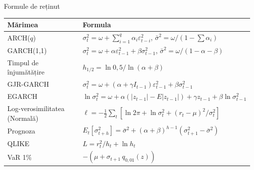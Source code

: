 \begin{frame}{Formule de reținut}
\itemsize{\small}
{\renewcommand{\arraystretch}{1.45}\begin{center}
\small
\begin{tabular}{ll}
\toprule
\textbf{Mărimea} & \textbf{Formula} \\
\midrule
ARCH($q$) & $\sigma_t^2 = \omega + \sum_{i=1}^{q}\alpha_i\varepsilon_{t-i}^2$, \quad $\bar\sigma^2 = \omega/(1 - \sum\alpha_i)$ \\
GARCH(1,1) & $\sigma_t^2 = \omega + \alpha\varepsilon_{t-1}^2 + \beta\sigma_{t-1}^2$, \quad $\bar\sigma^2 = \omega/(1 - \alpha - \beta)$ \\
Timpul de înjumătățire & $h_{1/2} = \ln 0{,}5/\ln(\alpha + \beta)$ \\
GJR-GARCH & $\sigma_t^2 = \omega + (\alpha + \gamma I_{t-1})\varepsilon_{t-1}^2 + \beta\sigma_{t-1}^2$ \\
EGARCH & $\ln\sigma_t^2 = \omega + \alpha(|z_{t-1}| - E|z_{t-1}|) + \gamma z_{t-1} + \beta\ln\sigma_{t-1}^2$ \\
Log-verosimilitatea (Normală) & $\ell = -\frac12\sum_t[\ln 2\pi + \ln\sigma_t^2 + (r_t - \mu)^2/\sigma_t^2]$ \\
Prognoza & $E_t[\sigma_{t+h}^2] = \bar\sigma^2 + (\alpha + \beta)^{h-1}(\sigma_{t+1}^2 - \bar\sigma^2)$ \\
QLIKE & $L = r_t^2/h_t + \ln h_t$ \\
VaR 1\% & $-(\mu + \sigma_{t+1}\,q_{0{,}01}(z))$ \\
\bottomrule
\end{tabular}
\end{center}
}
\end{frame}

